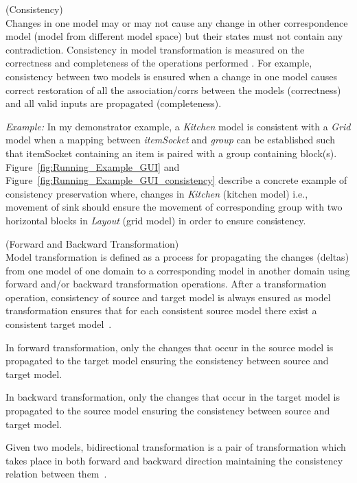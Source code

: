 \begin{defn}\label{defConsistency } (Consistency)\\
Changes in one model may or may not cause any change in other correspondence model (model from different model space) but their states must not contain any contradiction. Consistency in model transformation is measured on the correctness and completeness of the operations performed \cite{modelsynchro-tgg}. For example, consistency between two models is ensured when a change in one model causes correct  restoration of all the association/corrs between the models (correctness) and all valid inputs are propagated (completeness).
\end{defn} 

\textit{Example:} In my demonstrator example, a \textit{Kitchen} model is consistent with a \textit{Grid} model when a mapping between \textit{itemSocket} and \textit{group} can be established such that itemSocket containing an item is paired with a group containing block(s). 
Figure~\ref{fig:Running_Example_GUI} and Figure~\ref{fig:Running_Example_GUI_consistency} describe a concrete example of consistency preservation where, changes in \textit{Kitchen} (kitchen model) i.e., movement of sink should ensure the movement of corresponding group with two horizontal blocks in \textit{Layout} (grid model) in order to ensure consistency.

\begin{defn}\label{deffwdbkdtrans} (Forward and Backward Transformation)\\
Model transformation is defined as a process for propagating the changes (deltas) from one model of one domain to a corresponding model in another domain using forward and/or backward transformation operations. After a transformation operation, consistency of source and target model is always ensured as model transformation ensures that for each consistent source model there exist a consistent target model~\cite{modelsynchro-tgg}.

In forward transformation, only the changes that occur in the source model is propagated to the target model ensuring the consistency between source and target model.

In backward transformation, only the changes that occur in the target model is propagated to the source model ensuring the consistency between source and target model.

Given two models, bidirectional transformation is a pair of transformation which takes place in both forward and backward direction maintaining the consistency relation between them~\cite{understanding-bx}.
\end{defn}

